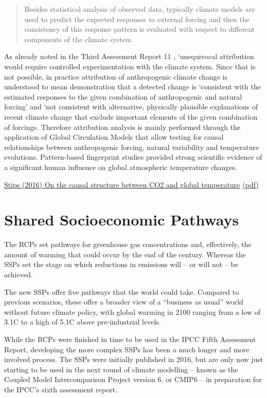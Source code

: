 \documentclass[
]{book}
\begin{document}
\begin{quote}
Besides statistical analysis of observed data, typically climate models
are used to predict the expected responses to external forcing and then
the consistency of this response pattern is evaluated with respect to
different components of the climate system
\end{quote}

As already noted in the Third Assessment Report 11 ,
`unequivocal attribution would require controlled experimentation
with the climate system.
Since that is not possible, in practice attribution of anthropogenic
climate change is understood to mean
demonstration that a detected change is
`consistent with the estimated responses to the given combination of
anthropogenic and natural forcing' and
`not consistent with alternative, physically plausible explanations of
recent climate change that exclude important
elements of the given combination of forcings.
Therefore attribution analysis is mainly performed through the
application of Global Circulation Models that allow
testing for causal relationships between anthropogenic forcing,
natural variability and temperature evolutions.
Pattern-based fingerprint studies provided strong scientific evidence of a
significant human influence on global atmospheric temperature changes.

\href{https://www.natur\%20e.com/articles/srep21691}{Stips (2016) On the causal structure between CO2 and global temperature}
\href{pdf/Stips_2016_Causal_structure_CO2_temperature.pdf}{(pdf)}

\hypertarget{shared-socioeconomic-pathways}{%
\section{Shared Socioeconomic Pathways}\label{shared-socioeconomic-pathways}}

The RCPs set pathways for greenhouse gas concentrations and, effectively, the amount of warming that could occur by the end of the century. Whereas the SSPs set the stage on which reductions in emissions will -- or will not -- be achieved.

The new SSPs offer five pathways that the world could take. Compared to previous scenarios, these offer a broader view of a ``business as usual'' world without future climate policy, with global warming in 2100 ranging from a low of 3.1C to a high of 5.1C above pre-industrial levels.

While the RCPs were finished in time to be used in the IPCC Fifth Assessment Report, developing the more complex SSPs has been a much longer and more involved process. The SSPs were initially published in 2016, but are only now just starting to be used in the next round of climate modelling -- known as the Coupled Model Intercomparison Project version 6, or CMIP6 -- in preparation for the IPCC's sixth assessment report.
\end{document}
